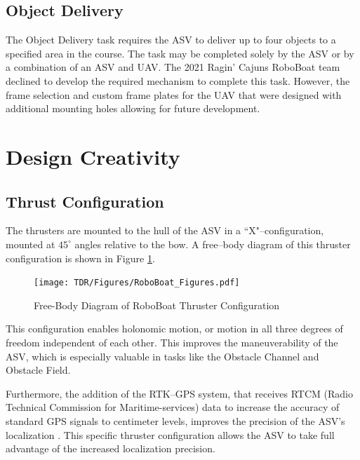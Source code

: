 \documentclass[letterpaper, 12 pt, conference]{ieeeconf}
\begin{document}
\subsection{Object Delivery}
\label{ObjectDelivery}
% 
The Object Delivery task requires the ASV to deliver up to four objects to a specified area in the course. The task may be completed solely by the ASV or by a combination of an ASV and UAV. The 2021 Ragin' Cajuns RoboBoat team declined to develop the required mechanism to complete this task. However, the frame selection and custom frame plates for the UAV that were designed with additional mounting holes allowing for future development.


\section{Design Creativity}
\subsection{Thrust Configuration}
% 
The thrusters are mounted to the hull of the ASV in a ``X"--configuration, mounted at $45^\circ$ angles relative to the bow. A free--body diagram of this thruster configuration is shown in Figure \ref{fig:FBD}.
%
\begin{figure}[tb]
\centering
\texttt{[image: TDR/Figures/RoboBoat\_Figures.pdf]}
\caption{Free-Body Diagram of RoboBoat Thruster Configuration}
\label{fig:FBD}
\end{figure}
This configuration enables holonomic motion, or motion in all three degrees of freedom independent of each other. This improves the maneuverability of the ASV, which is especially valuable in tasks like the Obstacle Channel and Obstacle Field.

Furthermore, the addition of the RTK--GPS system, that receives RTCM (Radio Technical Commission for Maritime-services) data to increase the accuracy of standard GPS signals to centimeter levels, improves the precision of the ASV's localization \cite{RTKLIB}. This specific thruster configuration allows the ASV to take full advantage of the increased localization precision.
\end{document}
